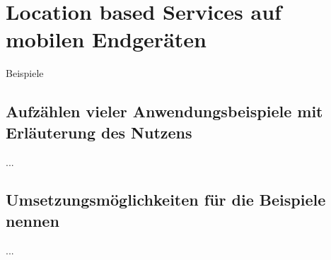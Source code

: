 \section{Location based Services auf mobilen Endgeräten}
Beispiele
	\subsection{Aufzählen vieler Anwendungsbeispiele mit Erläuterung des Nutzens}
...
	\subsection{Umsetzungsmöglichkeiten für die Beispiele nennen}
...
